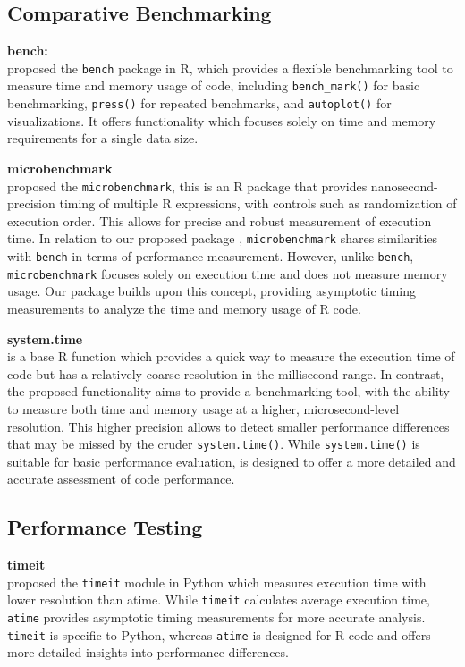 \subsection{Comparative Benchmarking}

\textbf{bench:} \\
\citet{bench} proposed the \texttt{bench} package in R, which provides a flexible benchmarking tool to measure time and memory usage of code, including \texttt{bench\_mark()} for basic benchmarking, \texttt{press()} for repeated benchmarks, and \texttt{autoplot()} for visualizations. It offers functionality which focuses solely on time and memory requirements for a single data size.
\vspace{0.1in}

\textbf{microbenchmark} \\
\citet{microbenchmark} proposed the \texttt{microbenchmark}, this is an R package that provides nanosecond-precision timing of multiple R expressions, with controls such as randomization of execution order. This allows for precise and robust measurement of execution time. In relation to our proposed package , \texttt{microbenchmark} shares similarities with \texttt{bench} in terms of performance measurement. However, unlike \texttt{bench}, \texttt{microbenchmark} focuses solely on execution time and does not measure memory usage. Our  package builds upon this concept, providing asymptotic timing measurements to analyze the time and memory usage of R code.
\vspace{0.1in}

\textbf{system.time} \\
\citet{system.time} is a base R function which provides a quick way to measure the execution time of code but has a relatively coarse resolution in the millisecond range. In contrast, the proposed  functionality aims to provide a benchmarking tool, with the ability to measure both time and memory usage at a higher, microsecond-level resolution. This higher precision allows  to detect smaller performance differences that may be missed by the cruder \texttt{system.time()}. While \texttt{system.time()} is suitable for basic performance evaluation,  is designed to offer a more detailed and accurate assessment of code performance.
\vspace{0.1in}

\subsection{Performance Testing}
\textbf{timeit} \\
\citet{timeit} proposed the \texttt{timeit} module in Python which measures execution time with lower resolution than atime. While \texttt{timeit} calculates average execution time, \texttt{atime} provides asymptotic timing measurements for more accurate analysis. \texttt{timeit} is specific to Python, whereas \texttt{atime} is designed for R code and offers more detailed insights into performance differences.
\vspace{0.1in}

